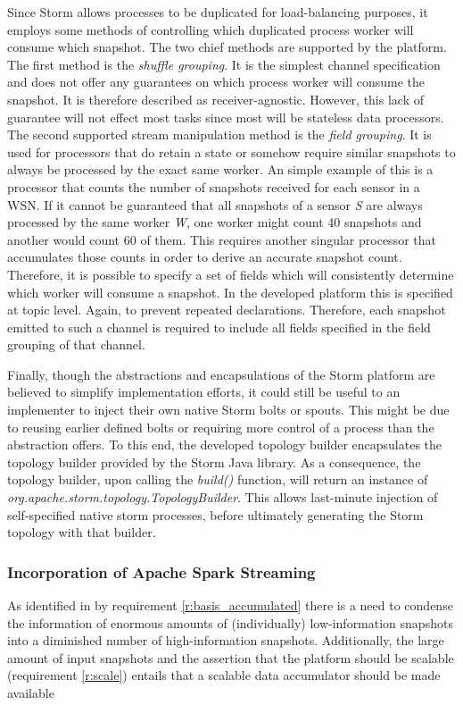 

Since Storm allows processes to be duplicated for load-balancing purposes, it employs some methods of controlling which duplicated process worker will consume which snapshot. The two chief methods are supported by the platform. The first method is the \emph{shuffle grouping}. It is the simplest channel specification and does not offer any guarantees on which process worker will consume the snapshot. It is therefore described as receiver-agnostic. However, this lack of guarantee will not effect most tasks since most will be stateless data processors. The second supported stream manipulation method is the \emph{field grouping}. It is used for processors that do retain a state or somehow require similar snapshots to always be processed by the exact same worker. An simple example of this is a processor that counts the number of snapshots received for each sensor in a WSN. If it cannot be guaranteed that all snapshots of a sensor \emph{S} are always processed by the same worker \emph{W}, one worker might count 40 snapshots and another would count 60 of them. This requires another singular processor that accumulates those counts in order to derive an accurate snapshot count. Therefore, it is possible to specify a set of fields which will consistently determine which worker will consume a snapshot. In the developed platform this is specified at topic level. Again, to prevent repeated declarations. Therefore, each snapshot emitted to such a channel is required to include all fields specified in the field grouping of that channel.

Finally, though the abstractions and encapsulations of the Storm platform are believed to simplify implementation efforts, it could still be useful to an implementer to inject their own native Storm bolts or spouts. This might be due to reusing earlier defined bolts or requiring more control of a process than the abstraction offers. To this end, the developed topology builder encapsulates the topology builder provided by the Storm Java library. As a consequence, the topology builder, upon calling the \emph{build()} function, will return an instance of \emph{org.apache.storm.topology.TopologyBuilder}. This allows last-minute injection of self-specified native storm processes, before ultimately generating the Storm topology with that builder.

\subsubsection*{Incorporation of Apache Spark Streaming}
\label{sec:incorporation_spark}
As identified in by requirement \ref{r:basis_accumulated} there is a need to condense the information of enormous amounts of (individually) low-information snapshots into a diminished number of high-information snapshots. Additionally, the large amount of input snapshots and the assertion that the platform should be scalable (requirement \ref{r:scale}) entails that a scalable data accumulator should be made available

